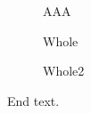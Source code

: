 \documentclass{article}
\begin{document}
\begin{figure}
\begin{minipage}{.4\textwidth}AAA\captionsetup{labelformat=empty}\end{minipage}
\caption{Whole}
\end{figure}
\begin{figure}
\caption{Whole2}
\end{figure}
End text.
\end{document}
